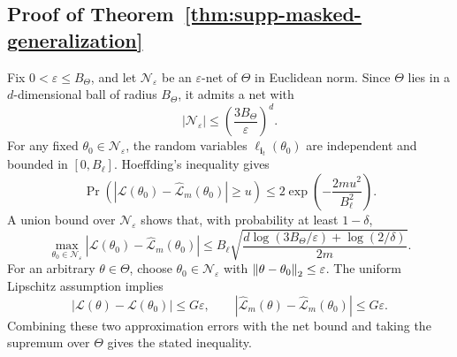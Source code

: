 \subsection{Proof of Theorem~\ref{thm:supp-masked-generalization}}

Fix \(0<\varepsilon\le B_\Theta\), and let
\(\mathcal{N}_\varepsilon\) be an \(\varepsilon\)-net of \(\Theta\) in
Euclidean norm. Since \(\Theta\) lies in a \(d\)-dimensional ball of radius
\(B_\Theta\), it admits a net with
\[
  |\mathcal{N}_\varepsilon|
  \le
  \left(\frac{3B_\Theta}{\varepsilon}\right)^d .
\]
For any fixed \(\theta_0\in\mathcal{N}_\varepsilon\), the random variables
\(\ell_{\mathbf{i}_t}(\theta_0)\) are independent and bounded in
\([0,B_\ell]\). Hoeffding's inequality gives
\[
  \Pr\left(
  \left|
  \mathcal{L}(\theta_0)-\widehat{\mathcal{L}}_m(\theta_0)
  \right|
  \ge u
  \right)
  \le
  2\exp\left(-\frac{2mu^2}{B_\ell^2}\right).
\]
A union bound over \(\mathcal{N}_\varepsilon\) shows that, with probability at
least \(1-\delta\),
\[
  \max_{\theta_0\in\mathcal{N}_\varepsilon}
  \left|
  \mathcal{L}(\theta_0)-\widehat{\mathcal{L}}_m(\theta_0)
  \right|
  \le
  B_\ell
  \sqrt{
  \frac{
  d\log(3B_\Theta/\varepsilon)+\log(2/\delta)}
  {2m}} .
\]
For an arbitrary \(\theta\in\Theta\), choose
\(\theta_0\in\mathcal{N}_\varepsilon\) with
\(\left\lVert \theta-\theta_0 \right\rVert_2\le\varepsilon\). The uniform Lipschitz assumption
implies
\[
  |\mathcal{L}(\theta)-\mathcal{L}(\theta_0)|\le G\varepsilon,
  \qquad
  |\widehat{\mathcal{L}}_m(\theta)-\widehat{\mathcal{L}}_m(\theta_0)|
  \le G\varepsilon .
\]
Combining these two approximation errors with the net bound and taking the
supremum over \(\Theta\) gives the stated inequality.
